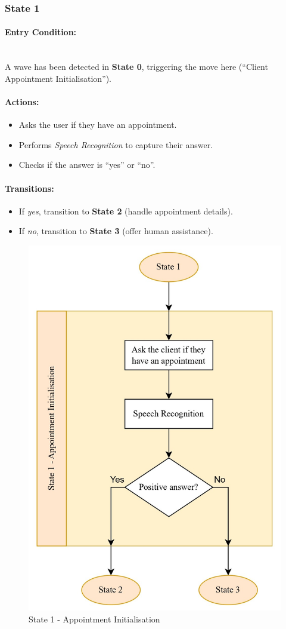 \documentclass[conference]{IEEEtran}
\begin{document}
\subsubsection{State 1}
\paragraph{Entry Condition:}
\mbox{}\\
A wave has been detected in \textbf{State 0}, triggering the move here (``Client Appointment Initialisation'').

\paragraph{Actions:}
\begin{itemize}
  \item Asks the user if they have an appointment.
  \item Performs \emph{Speech Recognition} to capture their answer.
  \item Checks if the answer is ``yes'' or ``no''.
\end{itemize}

\paragraph{Transitions:}
\begin{itemize}
  \item If \emph{yes}, transition to \textbf{State 2} (handle appointment details).
  \item If \emph{no}, transition to \textbf{State 3} (offer human assistance).
\end{itemize}

\begin{figure}
    \centering
    \includegraphics[width=.6\linewidth]{State 1 - Appointment Initialisation.jpg}
    \caption{State 1 - Appointment Initialisation}
    \label{State 1 - Appointment Initialisation}
\end{figure}
\end{document}
